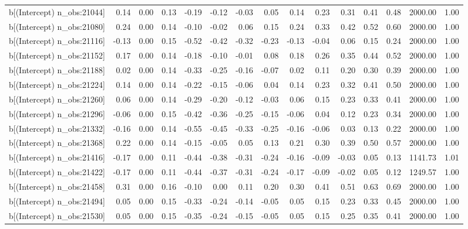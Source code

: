 \begin{table}[ht]
\begin{tabular}{rrrrrrrrrrrrrrr}
  b[(Intercept) n\_obs:21044] & 0.14 & 0.00 & 0.13 & -0.19 & -0.12 & -0.03 & 0.05 & 0.14 & 0.23 & 0.31 & 0.41 & 0.48 & 2000.00 & 1.00 \\ 
  b[(Intercept) n\_obs:21080] & 0.24 & 0.00 & 0.14 & -0.10 & -0.02 & 0.06 & 0.15 & 0.24 & 0.33 & 0.42 & 0.52 & 0.60 & 2000.00 & 1.00 \\ 
  b[(Intercept) n\_obs:21116] & -0.13 & 0.00 & 0.15 & -0.52 & -0.42 & -0.32 & -0.23 & -0.13 & -0.04 & 0.06 & 0.15 & 0.24 & 2000.00 & 1.00 \\ 
  b[(Intercept) n\_obs:21152] & 0.17 & 0.00 & 0.14 & -0.18 & -0.10 & -0.01 & 0.08 & 0.18 & 0.26 & 0.35 & 0.44 & 0.52 & 2000.00 & 1.00 \\ 
  b[(Intercept) n\_obs:21188] & 0.02 & 0.00 & 0.14 & -0.33 & -0.25 & -0.16 & -0.07 & 0.02 & 0.11 & 0.20 & 0.30 & 0.39 & 2000.00 & 1.00 \\ 
  b[(Intercept) n\_obs:21224] & 0.14 & 0.00 & 0.14 & -0.22 & -0.15 & -0.06 & 0.04 & 0.14 & 0.23 & 0.32 & 0.41 & 0.50 & 2000.00 & 1.00 \\ 
  b[(Intercept) n\_obs:21260] & 0.06 & 0.00 & 0.14 & -0.29 & -0.20 & -0.12 & -0.03 & 0.06 & 0.15 & 0.23 & 0.33 & 0.41 & 2000.00 & 1.00 \\ 
  b[(Intercept) n\_obs:21296] & -0.06 & 0.00 & 0.15 & -0.42 & -0.36 & -0.25 & -0.15 & -0.06 & 0.04 & 0.12 & 0.23 & 0.34 & 2000.00 & 1.00 \\ 
  b[(Intercept) n\_obs:21332] & -0.16 & 0.00 & 0.14 & -0.55 & -0.45 & -0.33 & -0.25 & -0.16 & -0.06 & 0.03 & 0.13 & 0.22 & 2000.00 & 1.00 \\ 
  b[(Intercept) n\_obs:21368] & 0.22 & 0.00 & 0.14 & -0.15 & -0.05 & 0.05 & 0.13 & 0.21 & 0.30 & 0.39 & 0.50 & 0.57 & 2000.00 & 1.00 \\ 
  b[(Intercept) n\_obs:21416] & -0.17 & 0.00 & 0.11 & -0.44 & -0.38 & -0.31 & -0.24 & -0.16 & -0.09 & -0.03 & 0.05 & 0.13 & 1141.73 & 1.01 \\ 
  b[(Intercept) n\_obs:21422] & -0.17 & 0.00 & 0.11 & -0.44 & -0.37 & -0.31 & -0.24 & -0.17 & -0.09 & -0.02 & 0.05 & 0.12 & 1249.57 & 1.00 \\ 
  b[(Intercept) n\_obs:21458] & 0.31 & 0.00 & 0.16 & -0.10 & 0.00 & 0.11 & 0.20 & 0.30 & 0.41 & 0.51 & 0.63 & 0.69 & 2000.00 & 1.00 \\ 
  b[(Intercept) n\_obs:21494] & 0.05 & 0.00 & 0.15 & -0.33 & -0.24 & -0.14 & -0.05 & 0.05 & 0.15 & 0.23 & 0.33 & 0.45 & 2000.00 & 1.00 \\ 
  b[(Intercept) n\_obs:21530] & 0.05 & 0.00 & 0.15 & -0.35 & -0.24 & -0.15 & -0.05 & 0.05 & 0.15 & 0.25 & 0.35 & 0.41 & 2000.00 & 1.00 \\ 

\end{tabular}
\end{table}
